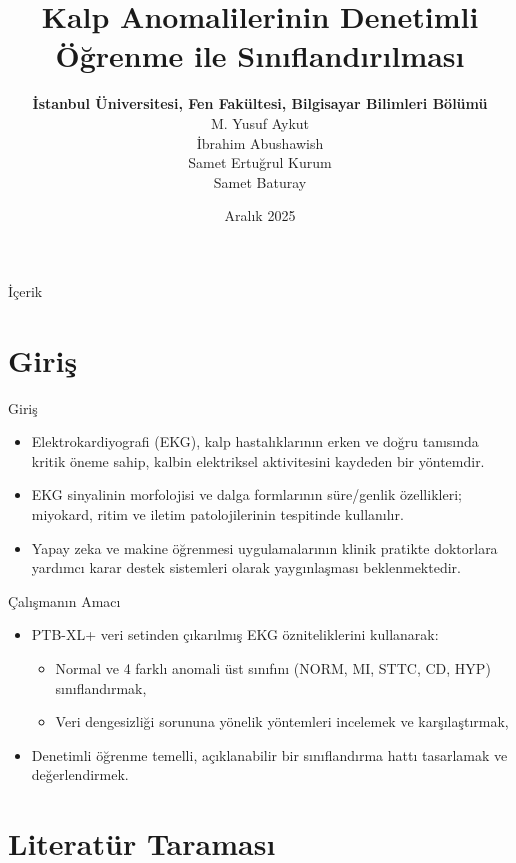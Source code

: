\documentclass[aspectratio=169]{beamer}
\title{Kalp Anomalilerinin Denetimli Öğrenme ile Sınıflandırılması}
\author{\textbf{İstanbul Üniversitesi, Fen Fakültesi, Bilgisayar Bilimleri Bölümü}\\M. Yusuf Aykut\\İbrahim Abushawish\\Samet Ertuğrul Kurum\\Samet Baturay}
\date{Aralık 2025}
\begin{document}
\begin{frame}
  \titlepage
\end{frame}

\begin{frame}{İçerik}
		\tableofcontents
\end{frame}

\section{Giriş}

\begin{frame}{Giriş}
	\begin{itemize}
		\item Elektrokardiyografi (EKG), kalp hastalıklarının erken ve doğru tanısında kritik öneme sahip, kalbin elektriksel aktivitesini kaydeden bir yöntemdir.
		\item EKG sinyalinin morfolojisi ve dalga formlarının süre/genlik özellikleri; miyokard, ritim ve iletim patolojilerinin tespitinde kullanılır.
		\item Yapay zeka ve makine öğrenmesi uygulamalarının klinik pratikte doktorlara yardımcı karar destek sistemleri olarak yaygınlaşması beklenmektedir.
	\end{itemize}
\end{frame}

\begin{frame}{Çalışmanın Amacı}
	\begin{itemize}
		\item PTB-XL+ veri setinden çıkarılmış EKG özniteliklerini kullanarak:
		\begin{itemize}
			\item Normal ve 4 farklı anomali üst sınıfını (NORM, MI, STTC, CD, HYP) sınıflandırmak,
			\item Veri dengesizliği sorununa yönelik yöntemleri incelemek ve karşılaştırmak,
		\end{itemize}
		\item Denetimli öğrenme temelli, açıklanabilir bir sınıflandırma hattı tasarlamak ve değerlendirmek.
	\end{itemize}
\end{frame}

\section{Literatür Taraması}
\end{document}

